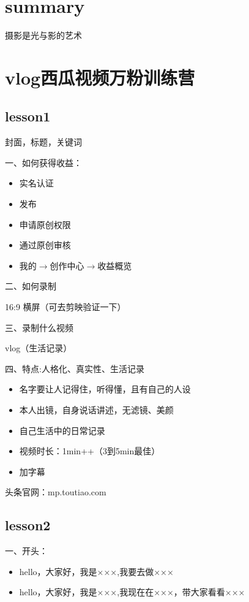 \documentclass{book}
\begin{document}
\section{summary}

摄影是光与影的艺术



\section{vlog西瓜视频万粉训练营}

\subsection{lesson1}
封面，标题，关键词

一、如何获得收益：\begin{itemize}
  \item 实名认证
  \item 发布
  \item 申请原创权限
  \item 通过原创审核
  \item 我的$\rightarrow$创作中心$\rightarrow$收益概览
\end{itemize}

二、如何录制

16:9 横屏（可去剪映验证一下）

三、录制什么视频

vlog（生活记录）

四、特点:人格化、真实性、生活记录\begin{itemize}
    \item 名字要让人记得住，听得懂，且有自己的人设
    \item 本人出镜，自身说话讲述，无滤镜、美颜
    \item 自己生活中的日常记录
    \item 视频时长：1min++（3到5min最佳）
    \item 加字幕
  \end{itemize}

头条官网：mp.toutiao.com

\subsection{lesson2}
一、开头：\begin{itemize}
       \item hello，大家好，我是×××,我要去做×××
       \item hello，大家好，我是×××,我现在在×××，带大家看看×××
     \end{itemize}
\end{document}
